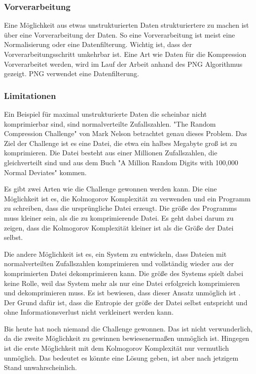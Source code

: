 \documentclass[conference]{IEEEtran}
\begin{document}
\subsubsection{Vorverarbeitung}

Eine Möglichkeit aus etwas unstrukturierten Daten strukturiertere zu machen ist über
eine Vorverarbeitung der Daten.
So eine Vorverarbeitung ist meist eine Normalisierung oder eine Datenfilterung.
Wichtig ist, dass der Vorverarbeitungsschritt umkehrbar ist.
Eine Art wie Daten für die Kompression Vorverarbeitet werden, wird im Lauf der
Arbeit anhand des PNG Algorithmus gezeigt.
PNG verwendet eine Datenfilterung.

\subsubsection{Limitationen}

Ein Beispiel für maximal unstrukturierte Daten die scheinbar nicht komprimierbar
sind, sind normalverteilte Zufallszahlen.
"The Random Compression Challenge" von Mark Nelson \cite{nelson} betrachtet genau dieses
Problem.
Das Ziel der Challenge ist es eine Datei, die etwa ein halbes Megabyte groß ist
zu komprimieren.
Die Datei besteht aus einer Millionen Zufallszahlen, die gleichverteilt sind und
aus dem Buch "A Million Random Digits with 100,000 Normal Deviates" \cite{amilli}
kommen.

Es gibt zwei Arten wie die Challenge gewonnen werden kann.
Die eine Möglichkeit ist es, die Kolmogorov Komplexität zu verwenden und ein
Programm zu schreiben, dass die ursprüngliche Datei erzeugt.
Die größe des Programms muss kleiner sein, als die zu komprimierende Datei.
Es geht dabei darum zu zeigen, dass die Kolmogorov Komplexität kleiner ist
als die Größe der Datei selbst.

Die andere Möglichkeit ist es, ein System zu entwickeln, dass Dateien mit normalverteilten
Zufallszahlen komprimieren und vollständig wieder aus der komprimierten Datei
dekomprimieren kann.
Die größe des Systems spielt dabei keine Rolle, weil das System mehr als nur eine
Datei erfolgreich komprimieren und dekomprimieren muss.
Es ist bewiesen, dass dieser Ansatz unmöglich ist \cite{nelson}.
Der Grund dafür ist, dass die Entropie der größe der Datei selbst entspricht und
ohne Informationsverlust nicht verkleinert werden kann.

Bis heute hat noch niemand die Challenge gewonnen.
Das ist nicht verwunderlich, da
die zweite Möglichkeit zu gewinnen bewiesenermaßen unmöglich ist.
Hingegen ist die erste Möglichkeit mit dem Kolmogorov Komplexität nur
vermutlich unmöglich.
Das bedeutet es könnte eine Lösung geben, ist aber nach jetzigem Stand unwahrscheinlich.
\end{document}
